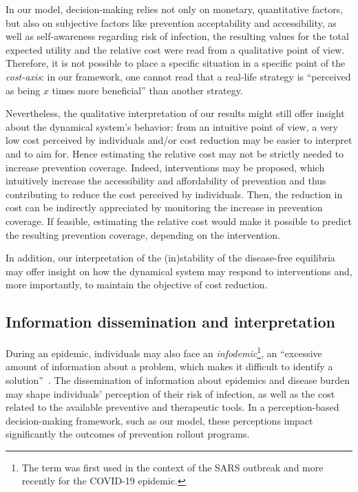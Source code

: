 In our model, decision-making relies not only on monetary, quantitative factors, but also on subjective factors like prevention acceptability and accessibility, as well as self-awareness regarding risk of infection, the resulting values for the total expected utility and the relative cost were read from a qualitative point of view. Therefore, it is not possible to place a specific situation in a specific point of the {\it cost-axis}: in our framework, one cannot read that a real-life strategy is ``perceived as being $x$ times more beneficial'' than another strategy. 

Nevertheless, the qualitative interpretation of our results might still offer insight about the dynamical system's behavior: from an intuitive point of view, a very low cost perceived by individuals and/or cost reduction may be easier to interpret and to aim for. Hence estimating the relative cost may not be strictly needed to increase prevention coverage. Indeed, interventions may be proposed, which intuitively increase the accessibility and affordability of prevention and thus contributing to reduce the cost perceived by individuals. Then, the reduction in cost can be indirectly appreciated by monitoring the increase in prevention coverage. If feasible, estimating the relative cost would make it possible to predict the resulting prevention coverage, depending on the intervention. 

In addition, our interpretation of the (in)stability of the disease-free equilibria may offer insight on how the dynamical system may respond to interventions and, more importantly, to maintain the objective of cost reduction. 

\subsection{Information dissemination and interpretation}

During an epidemic, individuals may also face an \textit{infodemic}\footnote{The term was first used in the context of the SARS outbreak and more recently for the COVID-19 epidemic.}, an ``excessive amount of information about a problem, which makes it difficult to identify a solution''~\cite[]{WHO_CovidInfodemic}. 
The dissemination of information about epidemics and disease burden may shape individuals' perception of their risk of infection, as well as the cost related to the available preventive and therapeutic tools. In a perception-based decision-making framework, such as our model, these perceptions impact significantly the outcomes of prevention rollout programs.

